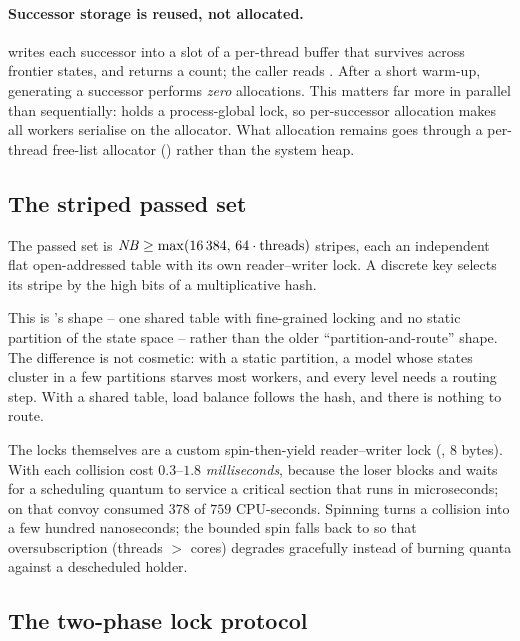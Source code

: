 \paragraph{Successor storage is reused, not allocated.}
 writes each successor into a slot of a per-thread buffer
that survives across frontier states, and returns a count; the caller reads
\code{buf[0..n)}.  After a short warm-up, generating a successor performs
\emph{zero} allocations.  This matters far more in parallel than sequentially:
 holds a process-global lock, so per-successor allocation makes
all workers serialise on the allocator.  What allocation remains goes through a
per-thread free-list allocator () rather than the system
heap.

\subsection{The striped passed set}

\FigStripes

The passed set is $\mathit{NB} \ge \max(16\,384,\, 64 \cdot \text{threads})$ stripes,
each an independent flat open-addressed table with its own reader--writer lock.
A discrete key selects its stripe by the high bits of a multiplicative hash.

This is \ltsmin{}'s shape -- one shared table with fine-grained locking and no
static partition of the state space -- rather than the older
``partition-and-route'' shape.  The difference is not cosmetic: with a static
partition, a model whose states cluster in a few partitions starves most
workers, and every level needs a routing step.  With a shared table, load
balance follows the hash, and there is nothing to route.

The locks themselves are a custom spin-then-yield reader--writer lock
(, $8$ bytes).  With  each collision cost
$0.3$--$1.8$ \emph{milliseconds}, because the loser blocks and waits for a
scheduling quantum to service a critical section that runs in microseconds; on
 that convoy consumed $378$ of $759$ CPU-seconds.  Spinning turns a
collision into a few hundred nanoseconds; the bounded spin falls back to
 so that oversubscription (threads $>$ cores) degrades gracefully
instead of burning quanta against a descheduled holder.

\subsection{The two-phase lock protocol}

